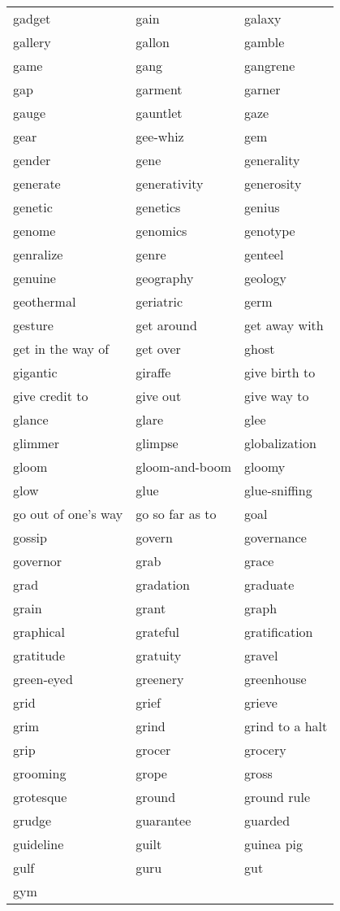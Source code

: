 \documentclass{minimal}
\begin{document}
\begin{longtable}{p{2.8cm}p{2.8cm}p{2.8cm}}
gadget & gain & galaxy \\
gallery & gallon & gamble \\
game & gang & gangrene \\
gap & garment & garner \\
gauge & gauntlet & gaze \\
gear & gee-whiz & gem \\
gender & gene & generality \\
generate & generativity & generosity \\
genetic & genetics & genius \\
genome & genomics & genotype \\
genralize & genre & genteel \\
genuine & geography & geology \\
geothermal & geriatric & germ \\
gesture & get around & get away with \\
get in the way of & get over & ghost \\
gigantic & giraffe & give birth to \\
give credit to & give out & give way to \\
glance & glare & glee \\
glimmer & glimpse & globalization \\
gloom & gloom-and-boom & gloomy \\
glow & glue & glue-sniffing \\
go out of one's way & go so far as to & goal \\
gossip & govern & governance \\
governor & grab & grace \\
grad & gradation & graduate \\
grain & grant & graph \\
graphical & grateful & gratification \\
gratitude & gratuity & gravel \\
green-eyed & greenery & greenhouse \\
grid & grief & grieve \\
grim & grind & grind to a halt \\
grip & grocer & grocery \\
grooming & grope & gross \\
grotesque & ground & ground rule \\
grudge & guarantee & guarded \\
guideline & guilt & guinea pig \\
gulf & guru & gut \\
gym
\end{longtable}
\end{document}
